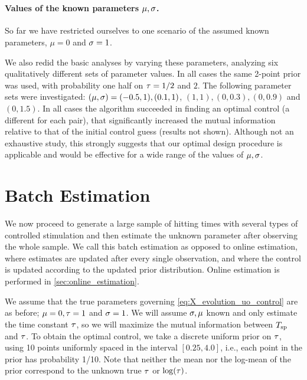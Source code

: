 \documentclass{article}
\begin{document}
\

\paragraph{Values of the known parameters $\mu, {\sigma }$.} 
So far we have restricted ourselves to one scenario of the assumed known
parameters, $\mu=0$ and ${\sigma }=1$. 

We also redid the basic analyses by varying these parameters, analyzing six
qualitatively different sets of parameter values. In all cases the same 2-point
prior was used, with probability one half on ${ \tau } = 1/2$ and $2$. The following
parameter sets were investigated: $(\mu,{\sigma })=(-0.5, 1), (0.1,1)$, $(1,1), (0, 
0.3), (0, 0.9)$ and $(0,1.5)$. In all cases the algorithm succeeded in finding
an optimal control (a different for each pair), that significantly increased the
mutual information relative to that of the initial control guess (results not
shown). Although not an exhaustive study, this strongly suggests that our
optimal design procedure is applicable and would be effective for a wide range
of the values of ${\mu },{\sigma }$.  

\section{Batch Estimation}
\label{sec:batch_estimation}
We now proceed to generate a large sample of hitting times with several types
of controlled stimulation and then estimate the unknown
parameter after observing the whole sample. We call this batch estimation as opposed to
online estimation, where estimates are updated after every single
observation, and where the control is updated according to the updated prior distribution.
Online estimation is performed in \cref{sec:online_estimation}.
 
We assume that the true parameters governing \cref{eq:X_evolution_uo_control}
are as before; $ {\mu } = 0, { \tau } = 1$ and $ {\sigma } = 1$. We will assume ${\sigma }, {\mu }$
known and only estimate the time constant ${ \tau }$, so
we will maximize the mutual information between ${ T_{\textrm{sp} } }$ and ${ \tau }$. To
obtain the optimal control, we take a discrete uniform prior on 
 ${ \tau }$, using 10 points uniformly spaced in the interval $[0.25, 4.0]$, i.e.,
 each point in the prior has probability 1/10. Note that neither the mean nor the
 log-mean of the prior correspond to the unknown true ${ \tau }$ or $\log({ \tau })$.
 
\end{document}
